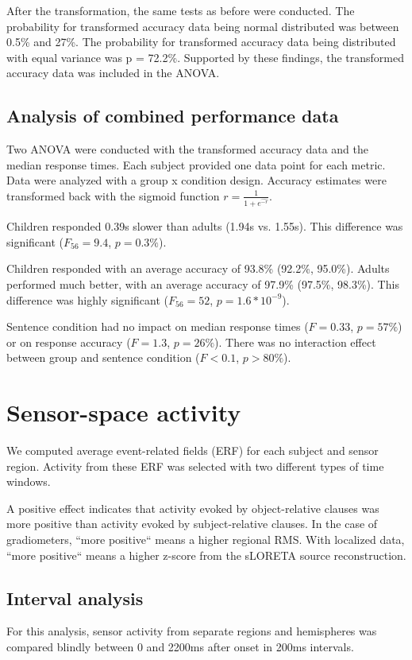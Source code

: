 After the transformation, the same tests as before were conducted.
The probability for transformed accuracy data being normal distributed was between 0.5\% and 27\%.
The probability for transformed accuracy data being distributed with equal variance was p = 72.2\%.
Supported by these findings, the transformed accuracy data was included in the ANOVA.

\subsection{Analysis of combined performance data}

Two ANOVA were conducted with the transformed accuracy data and the median response times.
Each subject provided one data point for each metric.
Data were analyzed with a group x condition design.
Accuracy estimates were transformed back with the sigmoid function $r = \frac{1}{1+e^{\hat{-r}}}$.

Children responded 0.39s slower than adults (1.94s vs. 1.55s).
This difference was significant ($F_{56} = 9.4$, $p = 0.3\%$).

Children responded with an average accuracy of 93.8\% (92.2\%, 95.0\%).
Adults performed much better, with an average accuracy of 97.9\% (97.5\%, 98.3\%).
This difference was highly significant ($F_{56} = 52$, $p = 1.6*10^{-9}$).

Sentence condition had no impact on median response times ($F = 0.33$, $p = 57\%$) or on response accuracy ($F = 1.3$, $p = 26\%$).
There was no interaction effect between group and sentence condition ($F < 0.1$, $p > 80\%$).

\section{Sensor-space activity}

We computed average event-related fields (ERF) for each subject and sensor region.
Activity from these ERF was selected with two different types of time windows.

A positive effect indicates that activity evoked by object-relative clauses was more positive than activity evoked by subject-relative clauses. In the case of gradiometers, ``more positive`` means a higher regional RMS. With localized data, ``more positive`` means a higher z-score from the sLORETA source reconstruction.


\subsection{Interval analysis}
For this analysis, sensor activity from separate regions and hemispheres was compared blindly between 0 and 2200ms after onset in 200ms intervals.

